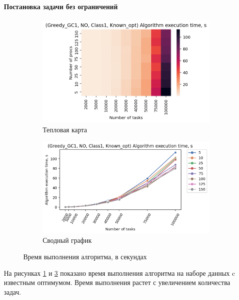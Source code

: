 \paragraph{Постановка задачи без ограничений}

\begin{figure}[!htbp]
    \centering
    \begin{subfigure}{0.49\textwidth}
        \includegraphics[width=\textwidth]{imgs/ideal_1/NO/et_heatmap.png}
        \caption{Тепловая карта}
        \label{fig:NO-exec-time-heatmap}
    \end{subfigure}
    \hfill
    \begin{subfigure}{0.49\textwidth}
        \includegraphics[width=\textwidth]{imgs/ideal_1/NO/tr_graph.png}
        \caption{Сводный график}
        \label{fig:NO-exec-time-compiled}
    \end{subfigure}
    \caption{Время выполнения алгоритма, в секундах}
\end{figure}

На рисунках \ref{fig:NO-exec-time-heatmap} и \ref{fig:NO-exec-time-compiled} показано время выполнения алгоритма на наборе данных c известным оптимумом. Время выполнения растет с увеличением количества задач. 

